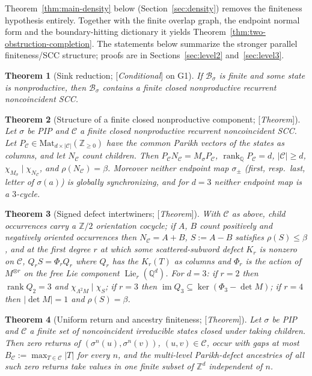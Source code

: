 \documentclass[11pt]{amsart}
\theoremstyle{plain}
\newtheorem{theorem}{Theorem}[section]
\theoremstyle{definition}
\theoremstyle{remark}
\newcommand{\Z}{\mathbb{Z}}
\newcommand{\Q}{\mathbb{Q}}
\newcommand{\B}{\mathcal{B}}
\newcommand{\cC}{\mathcal{C}}
\newcommand{\rank}{\operatorname{rank}}
\newcommand{\Lie}{\operatorname{Lie}}
\newcommand{\Status}[1]{\textup{[\textit{#1}]}}
\begin{document}
Theorem~\ref{thm:main-density} below (Section~\ref{sec:density}) removes the
finiteness hypothesis entirely.  Together with the finite overlap graph,
the endpoint normal form and the boundary-hitting dictionary it yields
Theorem~\ref{thm:two-obstruction-completion}.  The statements below summarize
the stronger parallel finiteness/SCC structure; proofs are in
Sections~\ref{sec:level2} and~\ref{sec:level3}.

\begin{theorem}[Sink reduction; \Status{Conditional} on G1]\label{thm:sink-summary}
If $\B_\sigma$ is finite and some state is nonproductive, then $\B_\sigma$ contains a finite closed nonproductive recurrent noncoincident SCC.
\end{theorem}

\begin{theorem}[Structure of a finite closed nonproductive component; \Status{Theorem}]\label{thm:structure-summary}
Let $\sigma$ be PIP and $\cC$ a finite closed nonproductive recurrent noncoincident SCC. Let $P_\cC\in\mathrm{Mat}_{d\times|\cC|}(\Z_{\ge0})$ have the common Parikh vectors of the states as columns, and let $N_\cC$ count children. Then $P_\cC N_\cC=M_\sigma P_\cC$, $\rank_\Q P_\cC=d$, $|\cC|\ge d$, $\chi_{M_\sigma}\mid\chi_{N_\cC}$, and $\rho(N_\cC)=\beta$. Moreover neither endpoint map $\sigma_\pm$ (first, resp.\ last, letter of $\sigma(a)$) is globally synchronizing, and for $d=3$ neither endpoint map is a $3$-cycle.
\end{theorem}

\begin{theorem}[Signed defect intertwiners; \Status{Theorem}]\label{thm:defect-summary}
With $\cC$ as above, child occurrences carry a $\Z/2$ orientation cocycle; if $A$, $B$ count positively and negatively oriented occurrences then $N_\cC=A+B$, $S:=A-B$ satisfies $\rho(S)\le\beta$, and at the first degree $r$ at which some scattered-subword defect $K_r$ is nonzero on $\cC$, $Q_rS=\Phi_rQ_r$ where $Q_r$ has the $K_r(T)$ as columns and $\Phi_r$ is the action of $M^{\otimes r}$ on the free Lie component $\Lie_r(\Q^d)$. For $d=3$: if $r=2$ then $\rank Q_2=3$ and $\chi_{\Lambda^2M}\mid\chi_S$; if $r=3$ then $\operatorname{im}Q_3\subseteq\ker(\Phi_3-\det M)$; if $r=4$ then $|\det M|=1$ and $\rho(S)=\beta$.
\end{theorem}

\begin{theorem}[Uniform return and ancestry finiteness; \Status{Theorem}]\label{thm:return-summary}
Let $\sigma$ be PIP and $\cC$ a finite set of noncoincident irreducible states closed under taking children. Then zero returns of $(\sigma^n(u),\sigma^n(v))$, $(u,v)\in\cC$, occur with gaps at most $B_\cC:=\max_{T\in\cC}|T|$ for every $n$, and the multi-level Parikh-defect ancestries of all such zero returns take values in one finite subset of $\Z^d$ independent of $n$.
\end{theorem}
\end{document}
